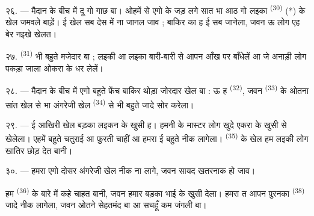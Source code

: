 
२६. --- मैदान के बीच में दू गो गाछ बा। ओहमें से एगो के जड़ लगे सात भा
आठ गो लइका  \textsuperscript{(30)} (*) के खेल जमवले
बाड़ें। ई खेल सब देस में ना जानल जाव ; बाकिर  का ह ई सब
जानेला, जवन ऊ लोग एह बेर नइखे खेलत।

\VUsaut{5.0mm}
\VUsaut{3.4mm}

२७.  \textsuperscript{(31)} भी बहुते मजेदार बा ;
लइकी आ लइका बारी-बारी से आपन आँख पर  बाँधेलें आ जे
अनाड़ी लोग पकड़ा जाला ओकरा के धर लेलें।

२८. --- मैदान के बीच में एगो बहुते फ्रेंच बाकिर थोड़ा जोरदार खेल बा :
ऊ ह  \textsuperscript{(32)}, जवन 
\textsuperscript{(33)} के ओतना सांत खेल से भा अंगरेजी खेल
 \textsuperscript{(34)} से भी बहुते जादे सोर करेला।

२९. --- ई आखिरी खेल बड़का लइकन के खुसी ह। हमनी के मास्टर लोग खुदे एकरा
के खुसी से खेलेला। एहमें बहुते चतुराई आ फुरती चाहीं आ हमरा ई बहुते नीक
लागेला।  \textsuperscript{(35)} के खेल हम लइकी लोग खातिर
छोड़ देत बानी।

३०. --- हमरा एगो दोसर अंगरेजी खेल नीक ना लागे, जवन सायद खतरनाक हो
जाव।

हम  \textsuperscript{(36)} के बारे में कहे चाहत बानी,
जवन हमार बड़का भाई के खुसी देला। हमरा त आपन पुरनका 
\textsuperscript{(38)} जादे नीक लागेला, जवन ओतने सेहतमंद बा आ सचहूँ कम
जंगली बा।

